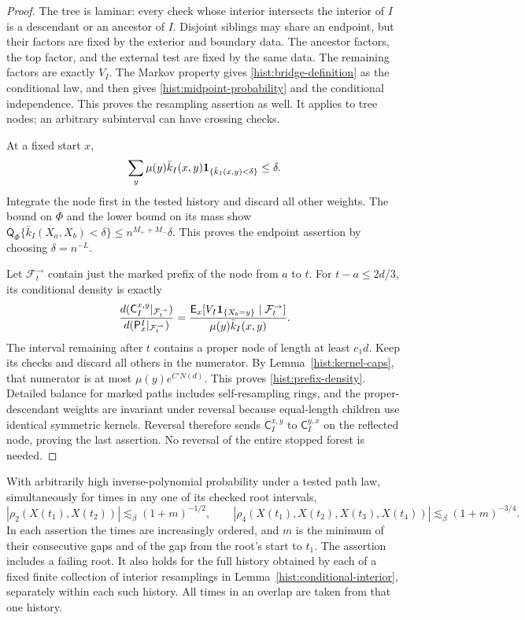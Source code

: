 \begin{proof}
The tree is laminar: every check whose interior intersects the interior of
$I$ is a descendant or an ancestor of $I$.  Disjoint siblings may share an
endpoint, but their factors are fixed by the exterior and boundary data.
The ancestor factors, the top factor, and the external test are fixed by
the same data.  The remaining factors are exactly
$V_I$.  The Markov property gives \eqref{hist:bridge-definition} as the
conditional law, and then gives \eqref{hist:midpoint-probability} and the
conditional independence.  This proves the resampling assertion as well.
It applies to tree nodes; an arbitrary subinterval can have crossing checks.

At a fixed start $x$,
\[
 \sum_y\mu(y)\bar k_I(x,y)\mathbf 1_{\{\bar k_I(x,y)<\delta\}}\le\delta.
\]
Integrate the node first in the tested history and discard all other weights.
The bound on $\Phi$ and the lower bound on its mass show
$\mathsf Q_\Phi\{\bar k_I(X_a,X_b)<\delta\}\le n^{M_++M_-}\delta$.
This proves the endpoint assertion by choosing $\delta=n^{-L}$.

Let $\mathcal F_t^\to$ contain just the marked prefix of the node from $a$
to $t$.  For $t-a\le2d/3$, its conditional density is exactly
\[
 \frac{d(\mathsf C_I^{x,y}|_{\mathcal F_t^\to})}
      {d(\mathsf P_x^I|_{\mathcal F_t^\to})}
 =\frac{\mathsf E_x[V_I\mathbf 1_{\{X_b=y\}}\mid\mathcal F_t^\to]}
        {\mu(y)\bar k_I(x,y)}.
\]
The interval remaining after $t$ contains a proper node of length at least
$c_1d$.  Keep its checks and discard all others in the numerator.  By
Lemma~\ref{hist:kernel-caps}, that numerator is at most $\mu(y)e^{C'N(d)}$.
This proves \eqref{hist:prefix-density}.  Detailed balance for marked paths
includes self-resampling rings, and the proper-descendant weights are
invariant under reversal because equal-length children use identical
symmetric kernels.  Reversal therefore sends $\mathsf C_I^{x,y}$ to
$\mathsf C_I^{y,x}$ on the reflected node, proving the last assertion.
No reversal of the entire stopped forest is needed.
\end{proof}

\begin{lemma}\label{hist:history-overlaps}
With arbitrarily high inverse-polynomial probability under a tested path
law, simultaneously for times in any one of its checked root intervals,
\begin{equation}\label{hist:path-overlaps}
 |\rho_2(X(t_1),X(t_2))|\lesssim_\beta(1+m)^{-1/2},\qquad
 |\rho_4(X(t_1),X(t_2),X(t_3),X(t_4))|
                    \lesssim_\beta(1+m)^{-3/4}.
\end{equation}
In each assertion the times are increasingly ordered, and $m$ is the
minimum of their consecutive gaps and of the gap from the root's start to
$t_1$.  The assertion includes a failing root.  It also holds for the
full history obtained by each of a fixed finite collection of interior
resamplings in Lemma~\ref{hist:conditional-interior}, separately within
each such history.  All times in an overlap are taken from that one history.
\end{lemma}

